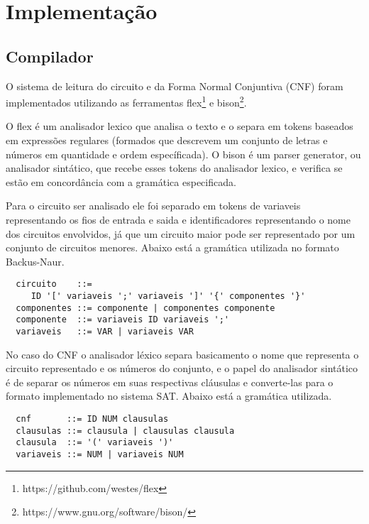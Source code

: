 \section{Implementação}
\label{sec:implementacao}

\subsection{Compilador}
\label{sec:Compilador}
O sistema de leitura do circuito e da Forma Normal Conjuntiva (CNF) foram implementados utilizando as ferramentas flex\footnote{https://github.com/westes/flex} e bison\footnote{https://www.gnu.org/software/bison/}.%

O flex é um analisador lexico%
que analisa o texto e o separa em tokens baseados em expressões regulares (formados que descrevem um conjunto de letras e números em quantidade e ordem específicada). O bison é um parser generator, ou analisador sintático, que recebe esses tokens do analisador lexico, e verifica se estão em concordância com a gramática
especificada.

Para o circuito ser analisado ele foi separado em tokens de variaveis representando os fios de entrada e saida e identificadores representando o nome dos circuitos envolvidos, já que um circuito maior pode ser representado por um conjunto de circuitos menores. Abaixo está a gramática utilizada no formato
Backus-Naur.
\begin{lstlisting}
  circuito    ::=
     ID '[' variaveis ';' variaveis ']' '{' componentes '}'
  componentes ::= componente | componentes componente
  componente  ::= variaveis ID variaveis ';'
  variaveis   ::= VAR | variaveis VAR
\end{lstlisting}

No caso do CNF o analisador léxico separa basicamento o nome que representa o circuito representado e os números do conjunto, e o papel do analisador sintático é de separar os números em suas respectivas cláusulas e converte-las para o formato implementado no sistema SAT. Abaixo está a gramática utilizada.
\begin{lstlisting}
  cnf       ::= ID NUM clausulas
  clausulas ::= clausula | clausulas clausula
  clausula  ::= '(' variaveis ')'
  variaveis ::= NUM | variaveis NUM
\end{lstlisting}

